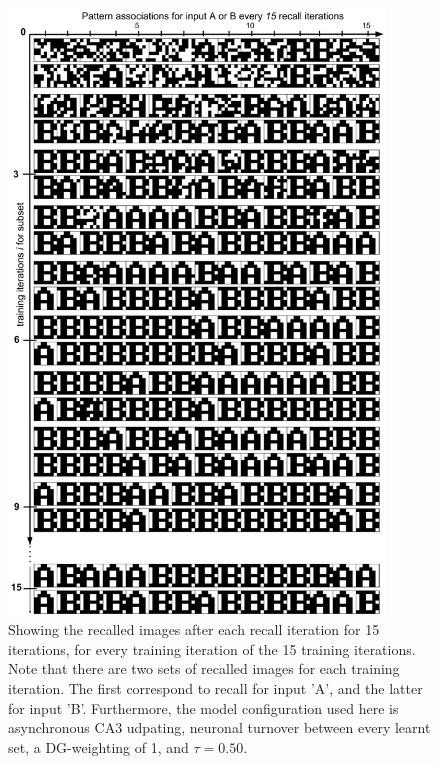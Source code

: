 \begin{figure}
    \centering
    \includegraphics[width=10cm]{fig/AB-pattern-associations-async-tm0-dgw1-tau050}
    \caption{Showing the recalled images after each recall iteration for 15 iterations, for every training iteration of the 15 training iterations. Note that there are two sets of recalled images for each training iteration. The first correspond to recall for input 'A', and the latter for input 'B'. Furthermore, the model configuration used here is asynchronous CA3 udpating, neuronal turnover between every learnt set, a DG-weighting of 1, and $\tau=0.50$.}
    \label{fig:low-level-3}
\end{figure}

